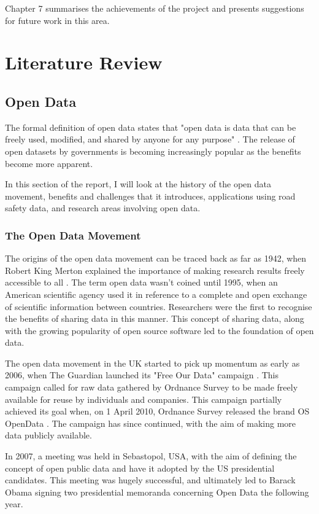 \documentclass[authoryearcitations]{UoYCSproject}
\begin{document}
Chapter 7 summarises the achievements of the project and presents suggestions for future work in this area.

\chapter{Literature Review}

\section{Open Data}

The formal definition of open data states that "open data is data that can be freely used, modified, and shared by anyone for any purpose" \citep{OpenKnowledge}. The release of open datasets by governments is becoming increasingly popular as the benefits become more apparent.

In this section of the report, I will look at the history of the open data movement, benefits and challenges that it introduces, applications using road safety data, and research areas involving open data.

\subsection{The Open Data Movement}

The origins of the open data movement can be traced back as far as 1942, when Robert King Merton explained the importance of making research results freely accessible to all \citep{Chignard2013}. The term open data wasn't coined until 1995, when an American scientific agency used it in reference to a complete and open exchange of scientific information between countries. Researchers were the first to recognise the benefits of sharing data in this manner. This concept of sharing data, along with the growing popularity of open source software led to the foundation of open data.

The open data movement in the UK started to pick up momentum as early as 2006, when The Guardian launched its "Free Our Data" campaign \citep{GuardianTechnology2006}. This campaign called for raw data gathered by Ordnance Survey to be made freely available for reuse by individuals and companies. This campaign partially achieved its goal when, on 1 April 2010, Ordnance Survey released the brand OS OpenData \citep{OrdnanceSurveyteam2010}. The campaign has since continued, with the aim of making more data publicly available. 

In 2007, a meeting was held in Sebastopol, USA, with the aim of defining the concept of open public data and have it adopted by the US presidential candidates. This meeting was hugely successful, and ultimately led to Barack Obama signing two presidential memoranda concerning Open Data the following year. 
\end{document}
